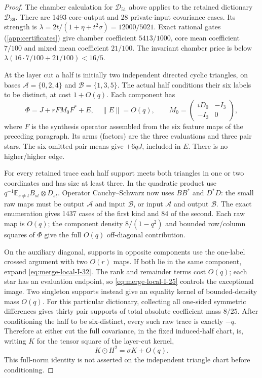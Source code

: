 \begin{proof}
The chamber calculation for $\mathcal D_{51}$ above applies to the retained dictionary $\mathcal D_{39}$.
There are 1493 core-output and 28 private-input covariance
cases. Its strength is
$\lambda=2t/(1+\eta+t^2\sigma)=12000/5021$.
Exact rational gates (\cref{app:certificates}) give chamber coefficient $5413/1000$,
core mean coefficient $7/100$ and mixed mean coefficient
$21/100$. The invariant chamber price is below
$\lambda(16\cdot7/100+21/100)<16/5$.

At the layer cut a half is initially two independent directed
cyclic triangles, on bases $\mathcal A=\{0,2,4\}$ and
$\mathcal B=\{1,3,5\}$. The actual half conditions their six
labels to be distinct, at cost $1+O(q)$. Each component has
\begin{equation}\label{eq:merge-local-I-32}
 \Phi=J+rFM_0F^*+E,\quad \|E\|=O(q),\qquad
 M_0=\begin{pmatrix}iD_0&-I_3\\-I_3&0\end{pmatrix},
\end{equation}
where $F$ is the synthesis operator assembled from the six
feature maps of the preceding paragraph. Its arms (factors) are
the three evaluations and three pair stars.
The six omitted pair means give $+6qJ$, included in $E$.
There is no higher/higher edge.

For every retained trace each half support meets both
triangles in one or two coordinates and has size at least
three. In the quadratic product use
$q^{-1}\mathbb E_{s\ne t}B_{st}\otimes D_{st}$.
Operator Cauchy--Schwarz now uses $BB^*$ and $D^*D$:
the small raw maps must be output $\mathcal A$ and input
$\mathcal B$, or input $\mathcal A$ and output $\mathcal B$.
The exact enumeration gives 1437 cases of the first kind and 84
of the second. Each raw map is $O(q)$; the component density
$8/(1-q^2)$ and bounded row/column squares of $\Phi$ give
the full $O(q)$ off-diagonal contribution.

On the auxiliary diagonal, supports in opposite components
use the one-label crossed argument with two $O(r)$ maps.
If both lie in the same component, expand \eqref{eq:merge-local-I-32}.
The rank and remainder terms cost $O(q)$; each star has an
evaluation endpoint, so \eqref{eq:merge-local-I-25} controls the exceptional
image. Two singleton supports instead give an equality
kernel of bounded-density mass $O(q)$.
For this particular dictionary, collecting all one-sided
symmetric differences gives thirty pair supports of total
absolute coefficient mass $8/25$. After conditioning the
half to be six-distinct, every such raw trace is exactly
$-q$. Therefore at either cut the full covariance, in the
fixed induced-half chart, is, writing $K$ for the tensor square
of the layer-cut kernel,
\begin{equation}\label{eq:merge-local-I-33}
 K\odot H^2=\sigma K+O(q).
\end{equation}
This full-norm identity is not asserted on the independent
triangle chart before conditioning.


\end{proof}
